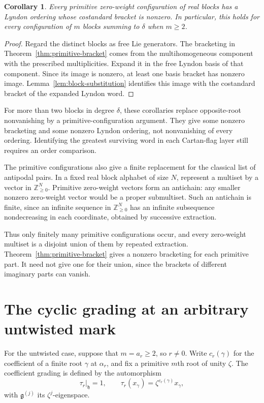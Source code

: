 \documentclass[11pt]{amsart}
\numberwithin{equation}{section}
\newtheorem{corollary}[theorem]{Corollary}
\theoremstyle{definition}
\newcommand{\Z}{\mathbb Z}
\newcommand{\g}{\mathfrak g}
\newcommand{\h}{\mathfrak h}
\begin{document}
\begin{corollary}\label{cor:nonzero-lyndon-order}
Every primitive zero-weight configuration of real blocks has a Lyndon ordering whose costandard bracket is nonzero. In particular, this holds for every configuration of $m$ blocks summing to $\delta$ when $m\geq2$.
\end{corollary}
\begin{proof}
Regard the distinct blocks as free Lie generators. The bracketing in Theorem~\ref{thm:primitive-bracket} comes from the multihomogeneous component with the prescribed multiplicities. Expand it in the free Lyndon basis of that component. Since its image is nonzero, at least one basis bracket has nonzero image. Lemma~\ref{lem:block-substitution} identifies this image with the costandard bracket of the expanded Lyndon word.
\end{proof}

For more than two blocks in degree $\delta$, these corollaries replace opposite-root nonvanishing by a primitive-configuration argument. They give some nonzero bracketing and some nonzero Lyndon ordering, not nonvanishing of every ordering. Identifying the greatest surviving word in each Cartan-flag layer still requires an order comparison.

The primitive configurations also give a finite replacement for the classical list of antipodal pairs. In a fixed real block alphabet of size $N$, represent a multiset by a vector in $\Z_{\geq0}^N$. Primitive zero-weight vectors form an antichain: any smaller nonzero zero-weight vector would be a proper submultiset. Such an antichain is finite, since an infinite sequence in $\Z_{\geq0}^N$ has an infinite subsequence nondecreasing in each coordinate, obtained by successive extraction.

Thus only finitely many primitive configurations occur, and every zero-weight multiset is a disjoint union of them by repeated extraction. Theorem~\ref{thm:primitive-bracket} gives a nonzero bracketing for each primitive part. It need not give one for their union, since the brackets of different imaginary parts can vanish.

\section{The cyclic grading at an arbitrary untwisted mark}\label{sec:grading}

For the untwisted case, suppose that $m=a_r\geq2$, so $r\ne0$. Write $c_r(\gamma)$ for the coefficient of a finite root $\gamma$ at $\alpha_r$, and fix a primitive $m$th root of unity $\zeta$. The coefficient grading is defined by the automorphism
\[
 \tau_r|_\h=1,\qquad
 \tau_r(x_\gamma)=\zeta^{c_r(\gamma)}x_\gamma,
\]
with $\g^{(j)}$ its $\zeta^j$-eigenspace.
\end{document}
